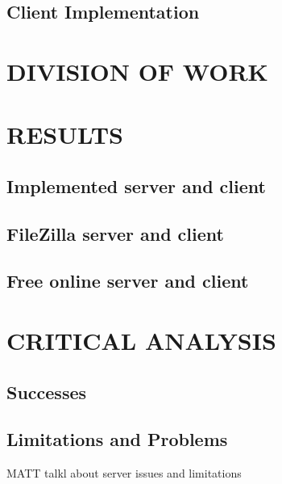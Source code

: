\documentclass[10pt,twocolumn]{witseiepaper}
\begin{document}
\subsection{Client Implementation}
\label{sec: Client Implementation}

%
\section{DIVISION OF WORK}
\label{sec: Division of Work}

%
\section{RESULTS}
\label{sec: Results}


\subsection{Implemented server and client}
\label{sec: Results implemented server}

\subsection{FileZilla server and client}
\label{sec: Results FileZilla}


\subsection{Free online server and client}
\label{sec: Results Online}


%
\section{CRITICAL ANALYSIS}
\label{sec: Critical Analysis}

\subsection{Successes}
\label{sec: Successes}


\subsection{Limitations and Problems}
\label{sec: Limitations and Problems}
MATT talkl about server issues and limitations
\end{document}
